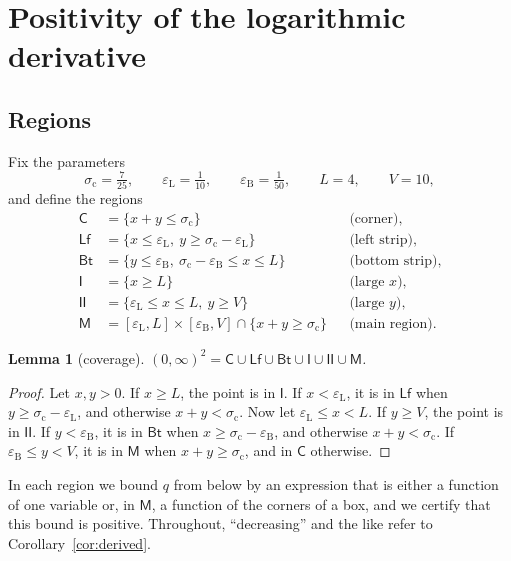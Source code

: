\documentclass[11pt,a4paper]{article}
\newtheorem{lemma}[theorem]{Lemma}
\theoremstyle{definition}
\theoremstyle{remark}
\newcommand{\sig}{\sigma_{\mathrm c}}
\newcommand{\eL}{\varepsilon_{\mathrm L}}
\newcommand{\eB}{\varepsilon_{\mathrm B}}
\newcommand{\Lx}{L}
\newcommand{\Vy}{V}
\begin{document}
\section{Positivity of the logarithmic derivative}\label{sec:proof}
\subsection{Regions}
Fix the parameters
\[
\sig=\tfrac7{25},\qquad \eL=\tfrac1{10},\qquad \eB=\tfrac1{50},\qquad \Lx=4,\qquad \Vy=10,
\]
and define the regions
\begin{align*}
\mathsf C&=\{x+y\le\sig\} &&\text{(corner)},\\
\mathsf{Lf}&=\{x\le\eL,\ y\ge\sig-\eL\} &&\text{(left strip)},\\
\mathsf{Bt}&=\{y\le\eB,\ \sig-\eB\le x\le\Lx\} &&\text{(bottom strip)},\\
\mathsf{I}&=\{x\ge\Lx\} &&\text{(large $x$)},\\
\mathsf{II}&=\{\eL\le x\le\Lx,\ y\ge\Vy\} &&\text{(large $y$)},\\
\mathsf M&=[\eL,\Lx]\times[\eB,\Vy]\cap\{x+y\ge\sig\} &&\text{(main region)}.
\end{align*}

\begin{lemma}[coverage]\label{lem:cover}
$(0,\infty)^2=\mathsf C\cup\mathsf{Lf}\cup\mathsf{Bt}\cup\mathsf I\cup\mathsf{II}\cup\mathsf M$.
\end{lemma}
\begin{proof}
Let $x,y>0$. If $x\ge\Lx$, the point is in $\mathsf I$. If $x<\eL$, it is in $\mathsf{Lf}$ when $y\ge\sig-\eL$, and otherwise $x+y<\sig$. Now let $\eL\le x<\Lx$. If $y\ge\Vy$, the point is in $\mathsf{II}$. If $y<\eB$, it is in $\mathsf{Bt}$ when $x\ge\sig-\eB$, and otherwise $x+y<\sig$. If $\eB\le y<\Vy$, it is in $\mathsf M$ when $x+y\ge\sig$, and in $\mathsf C$ otherwise.
\end{proof}

In each region we bound $q$ from below by an expression that is either a function of one variable or, in $\mathsf M$, a function of the corners of a box, and we certify that this bound is positive. Throughout, ``decreasing'' and the like refer to Corollary~\ref{cor:derived}.
\end{document}
